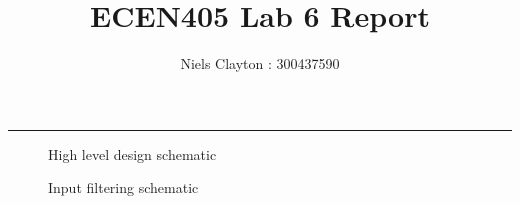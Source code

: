 \documentclass[a4paper,11pt]{article}
\begin{document}
\title{\LARGE{\textbf{ECEN405 Lab 6 Report}}}
\author{Niels Clayton : 300437590}
\date{}
\maketitle
\hrule

\begin{figure}[h!]
    \centering
    \caption{High level design schematic}
\end{figure}

\begin{figure}[h!]
    \centering
    \caption{Input filtering schematic}
\end{figure}
\end{document}
